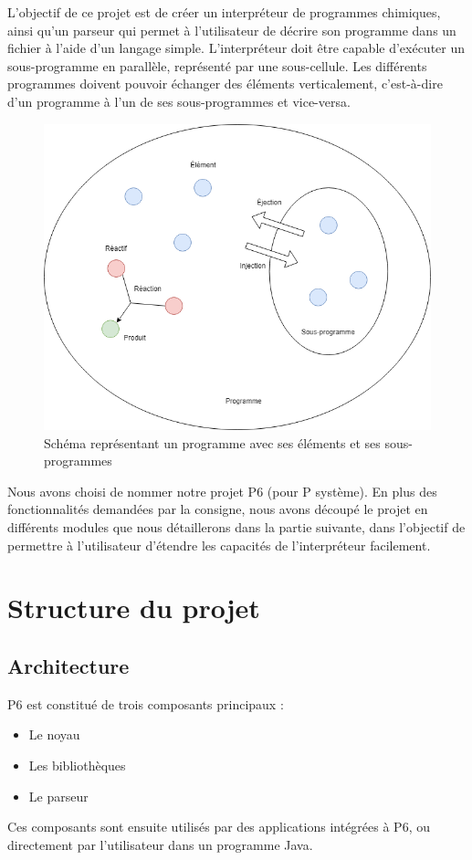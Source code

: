 \documentclass[a4paper, 12pt]{article}
\begin{document}
L’objectif de ce projet est de créer un interpréteur de programmes chimiques, ainsi qu’un parseur qui permet à l’utilisateur de décrire son programme dans un fichier à l’aide d’un langage simple. L’interpréteur doit être capable d’exécuter un sous-programme en parallèle, représenté par une sous-cellule. Les différents programmes doivent pouvoir échanger des éléments verticalement, c’est-à-dire d’un programme à l’un de ses sous-programmes et vice-versa.

\begin{figure}[!ht]
  \centering
  \includegraphics[scale=0.5]{./img/Programme.png}
  \caption{Schéma représentant un programme avec ses éléments et ses sous-programmes}
\end{figure}

Nous avons choisi de nommer notre projet P6 (pour P système). En plus des fonctionnalités demandées par la consigne, nous avons découpé le projet en différents modules que nous détaillerons dans la partie suivante, dans l’objectif de permettre à l’utilisateur d’étendre les capacités de l’interpréteur facilement.

\section{Structure du projet}
\subsection{Architecture}
P6 est constitué de trois composants principaux :
\begin{itemize}
  \item Le noyau
  \item Les bibliothèques
  \item Le parseur
\end{itemize}
Ces composants sont ensuite utilisés par des applications intégrées à P6, ou directement par l’utilisateur dans un programme Java.
\end{document}
